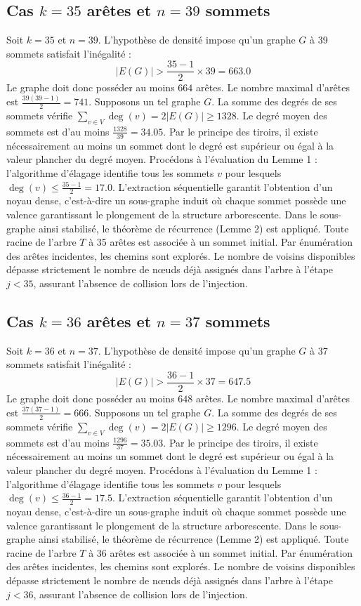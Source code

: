 \documentclass[12pt,a4paper]{article}
\begin{document}
\subsection{Cas $k = 35$ arêtes et $n = 39$ sommets}
Soit $k = 35$ et $n = 39$. L'hypothèse de densité impose qu'un graphe $G$ à 39 sommets satisfait l'inégalité :
$$ |E(G)| > \frac{35-1}{2} \times 39 = 663.0 $$
Le graphe doit donc posséder au moins $664$ arêtes. Le nombre maximal d'arêtes est $\frac{39(39-1)}{2} = 741$.
Supposons un tel graphe $G$. La somme des degrés de ses sommets vérifie $\sum_{v \in V} \deg(v) = 2|E(G)| \geq 1328$.
Le degré moyen des sommets est d'au moins $\frac{1328}{39} = 34.05$.
Par le principe des tiroirs, il existe nécessairement au moins un sommet dont le degré est supérieur ou égal à la valeur plancher du degré moyen.
Procédons à l'évaluation du Lemme 1 : l'algorithme d'élagage identifie tous les sommets $v$ pour lesquels $\deg(v) \leq \frac{35-1}{2} = 17.0$.
L'extraction séquentielle garantit l'obtention d'un noyau dense, c'est-à-dire un sous-graphe induit où chaque sommet possède une valence garantissant le plongement de la structure arborescente.
Dans le sous-graphe ainsi stabilisé, le théorème de récurrence (Lemme 2) est appliqué. Toute racine de l'arbre $T$ à 35 arêtes est associée à un sommet initial. Par énumération des arêtes incidentes, les chemins sont explorés. Le nombre de voisins disponibles dépasse strictement le nombre de nœuds déjà assignés dans l'arbre à l'étape $j < 35$, assurant l'absence de collision lors de l'injection.

\subsection{Cas $k = 36$ arêtes et $n = 37$ sommets}
Soit $k = 36$ et $n = 37$. L'hypothèse de densité impose qu'un graphe $G$ à 37 sommets satisfait l'inégalité :
$$ |E(G)| > \frac{36-1}{2} \times 37 = 647.5 $$
Le graphe doit donc posséder au moins $648$ arêtes. Le nombre maximal d'arêtes est $\frac{37(37-1)}{2} = 666$.
Supposons un tel graphe $G$. La somme des degrés de ses sommets vérifie $\sum_{v \in V} \deg(v) = 2|E(G)| \geq 1296$.
Le degré moyen des sommets est d'au moins $\frac{1296}{37} = 35.03$.
Par le principe des tiroirs, il existe nécessairement au moins un sommet dont le degré est supérieur ou égal à la valeur plancher du degré moyen.
Procédons à l'évaluation du Lemme 1 : l'algorithme d'élagage identifie tous les sommets $v$ pour lesquels $\deg(v) \leq \frac{36-1}{2} = 17.5$.
L'extraction séquentielle garantit l'obtention d'un noyau dense, c'est-à-dire un sous-graphe induit où chaque sommet possède une valence garantissant le plongement de la structure arborescente.
Dans le sous-graphe ainsi stabilisé, le théorème de récurrence (Lemme 2) est appliqué. Toute racine de l'arbre $T$ à 36 arêtes est associée à un sommet initial. Par énumération des arêtes incidentes, les chemins sont explorés. Le nombre de voisins disponibles dépasse strictement le nombre de nœuds déjà assignés dans l'arbre à l'étape $j < 36$, assurant l'absence de collision lors de l'injection.
\end{document}
